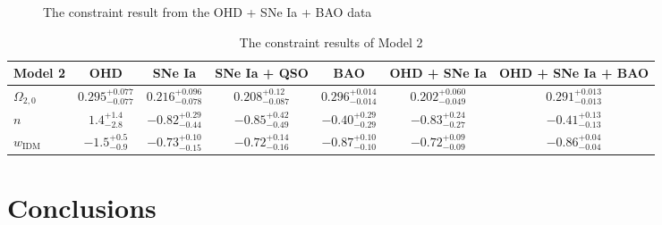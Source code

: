 \documentclass[twocolumn]{aastex631}
\begin{document}
   \begin{figure}[htbp]
      \centering
      \caption{The constraint result from the OHD + SNe Ia + BAO data}
   \end{figure}

   \begin{table}[htbp]
      \caption{The constraint results of Model 2}
      \centering
      \begin{tabular}{lcccccc}
         \hline\hline
         Model 2 & OHD & SNe Ia & SNe Ia + QSO & BAO &
          OHD + SNe Ia & OHD + SNe Ia + BAO \\
         \hline
         $\Omega_{2,0}$ & $0.295_{-0.077}^{+0.077}$ & $0.216_{-0.078}^{+0.096}$
          & $0.208_{-0.087}^{+0.12}$ & $0.296_{-0.014}^{+0.014}$
          & $0.202_{-0.049}^{+0.060}$ & $0.291_{-0.013}^{+0.013}$ \\
         $n$ & $1.4_{-2.8}^{+1.4}$ & $-0.82_{-0.44}^{+0.29}$
          & $-0.85_{-0.49}^{+0.42}$ & $-0.40_{-0.29}^{+0.29}$
          & $-0.83_{-0.27}^{+0.24}$ & $-0.41_{-0.13}^{+0.13}$ \\
         $w_{\text{IDM}}$ & $-1.5_{-0.9}^{+0.5}$ & $-0.73_{-0.15}^{+0.10}$
          & $-0.72_{-0.16}^{+0.14}$ & $-0.87_{-0.10}^{+0.10}$
          & $-0.72_{-0.09}^{+0.09}$ & $-0.86_{-0.04}^{+0.04}$ \\
         \hline
      \end{tabular}
      \label{tab:6}
   \end{table}

\section{Conclusions}
\end{document}
